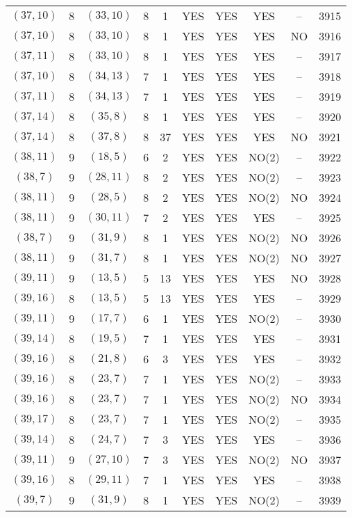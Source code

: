 \begin{longtable}{|c|c|c|c|c|c|c|c|c|c|}
$(37, 10)$ & 8 & $(33, 10)$ & 8 & 1 & YES & YES & YES & -- & 3915\\
$(37, 10)$ & 8 & $(33, 10)$ & 8 & 1 & YES & YES & YES & NO & 3916\\
$(37, 11)$ & 8 & $(33, 10)$ & 8 & 1 & YES & YES & YES & -- & 3917\\
$(37, 10)$ & 8 & $(34, 13)$ & 7 & 1 & YES & YES & YES & -- & 3918\\
$(37, 11)$ & 8 & $(34, 13)$ & 7 & 1 & YES & YES & YES & -- & 3919\\
$(37, 14)$ & 8 & $(35, 8)$ & 8 & 1 & YES & YES & YES & -- & 3920\\
$(37, 14)$ & 8 & $(37, 8)$ & 8 & 37 & YES & YES & YES & NO & 3921\\
$(38, 11)$ & 9 & $(18, 5)$ & 6 & 2 & YES & YES & NO(2) & -- & 3922\\
$(38, 7)$ & 9 & $(28, 11)$ & 8 & 2 & YES & YES & NO(2) & -- & 3923\\
$(38, 11)$ & 9 & $(28, 5)$ & 8 & 2 & YES & YES & NO(2) & NO & 3924\\
$(38, 11)$ & 9 & $(30, 11)$ & 7 & 2 & YES & YES & YES & -- & 3925\\
$(38, 7)$ & 9 & $(31, 9)$ & 8 & 1 & YES & YES & NO(2) & NO & 3926\\
$(38, 11)$ & 9 & $(31, 7)$ & 8 & 1 & YES & YES & NO(2) & NO & 3927\\
$(39, 11)$ & 9 & $(13, 5)$ & 5 & 13 & YES & YES & YES & NO & 3928\\
$(39, 16)$ & 8 & $(13, 5)$ & 5 & 13 & YES & YES & YES & -- & 3929\\
$(39, 11)$ & 9 & $(17, 7)$ & 6 & 1 & YES & YES & NO(2) & -- & 3930\\
$(39, 14)$ & 8 & $(19, 5)$ & 7 & 1 & YES & YES & YES & -- & 3931\\
$(39, 16)$ & 8 & $(21, 8)$ & 6 & 3 & YES & YES & YES & -- & 3932\\
$(39, 16)$ & 8 & $(23, 7)$ & 7 & 1 & YES & YES & NO(2) & -- & 3933\\
$(39, 16)$ & 8 & $(23, 7)$ & 7 & 1 & YES & YES & NO(2) & NO & 3934\\
$(39, 17)$ & 8 & $(23, 7)$ & 7 & 1 & YES & YES & NO(2) & -- & 3935\\
$(39, 14)$ & 8 & $(24, 7)$ & 7 & 3 & YES & YES & YES & -- & 3936\\
$(39, 11)$ & 9 & $(27, 10)$ & 7 & 3 & YES & YES & NO(2) & NO & 3937\\
$(39, 16)$ & 8 & $(29, 11)$ & 7 & 1 & YES & YES & YES & -- & 3938\\
$(39, 7)$ & 9 & $(31, 9)$ & 8 & 1 & YES & YES & NO(2) & -- & 3939\\

\end{longtable}
